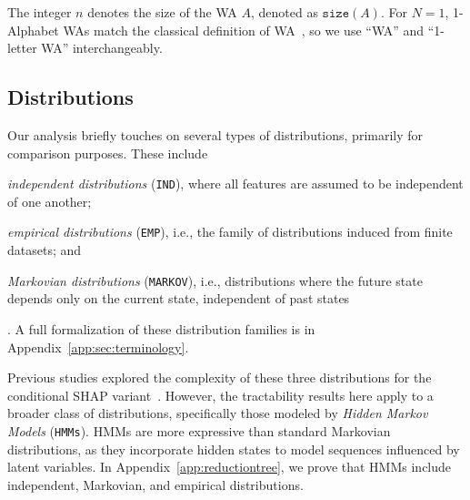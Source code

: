 The integer $n$ denotes the size of the WA $A$, denoted as $\texttt{size}(A)$. For $N = 1$, 1-Alphabet WAs match the classical definition of WA~\citep{droste10}, so we use ``WA'' and ``1-letter WA'' interchangeably.




\subsection{Distributions}

Our analysis briefly touches on several types of distributions, primarily for comparison purposes. These include \begin{inparaenum}[(i)]
\item \emph{independent distributions} (\texttt{IND}), where all features are assumed to be independent of one another; \item \emph{empirical distributions} (\texttt{EMP}), i.e., the family of distributions induced from finite datasets; and 
\item \emph{Markovian distributions} (\texttt{MARKOV}), i.e., distributions where the future state depends only on the current state, independent of past states\end{inparaenum}. A full formalization of these distribution families is in Appendix~\ref{app:sec:terminology}.

Previous studies explored the complexity of these three distributions for the conditional SHAP variant~\citep{arenas23, vander21, marzouk24a, huangupdates}. However, the tractability results here apply to a broader class of distributions, specifically those modeled by \emph{Hidden Markov Models} (\texttt{HMMs}). HMMs are more expressive than standard Markovian distributions, as they incorporate hidden states to model sequences influenced by latent variables. In Appendix~\ref{app:reductiontree}, we prove that HMMs include independent, Markovian, and empirical distributions.


